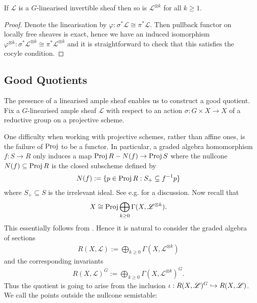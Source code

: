 \documentclass[12pt]{ociamthesis}  %
\begin{document}
\begin{lemma}
  If $\mathscr L$ is a $G$-linearised invertible sheaf then so is
  $\mathscr L^{\otimes k}$ for all $k\geq 1$.
  \begin{proof}
    Denote the linearisation by $\varphi : \sigma^*\mathscr L \cong \pi^*\mathscr
      L$.  Then pullback functor on locally free sheaves is exact, hence we have
    an induced isomorphism $\varphi^{\otimes k} : \sigma^*\mathscr L^{\otimes k}
      \cong \pi^*\mathscr L^{\otimes k}$ and it is straightforward to check that
    this satisfies the cocyle condition.
  \end{proof}
\end{lemma}

\subsection{Good Quotients}

The presence of a linearised ample sheaf enables us to construct a good
quotient.  Fix a $G$-linearised ample sheaf $\mathscr L$ with respect to an
action $\sigma : G\times X\to X$ of a reductive group on a projective scheme.

One difficulty when working with projective schemes, rather
than affine ones, is the failure of $\operatorname{Proj}$ to be a functor. In particular,
a graded algebra homomorphism $f : S \to R$ only induces a map
$\operatorname{Proj} R - N(f) \to \operatorname{Proj} S$ where the nullcone $N(f)\subseteq\operatorname{Proj} R$ is the closed
subscheme defined by
\begin{align*}
  N(f) := \{ p \in \operatorname{Proj} R : S_+ \subseteq f^{-1}p\}
\end{align*}
where $S_+\subseteq S$ is the irrelevant ideal. See e.g.
\cite[Remark 13.7]{gortz2010} for a discussion. Now recall that
\begin{align*}
  X \cong \operatorname{Proj}\bigoplus_{k\geq 0}\Gamma(X,\mathscr L^{\otimes k}).
\end{align*}
This essentially follows from \cite[Proposition 13.48]{gortz2010}. Hence
it is natural to consider the graded algebra of sections
\begin{align*}
  R(X,\mathscr L) := \bigoplus_{k\geq 0}\Gamma(X,\mathscr L^{\otimes k})
\end{align*}
and the corresponding invariants
\begin{align*}
  R(X,\mathscr L)^G := \bigoplus_{k\geq 0}\Gamma(X,\mathscr L^{\otimes k})^G.
\end{align*}
Thus the quotient is going to arise from the inclusion
$\iota : R(X,\mathscr L)^G\hookrightarrow R(X,\mathscr L)$. We call the points outside the nullcone
semistable:
\end{document}
